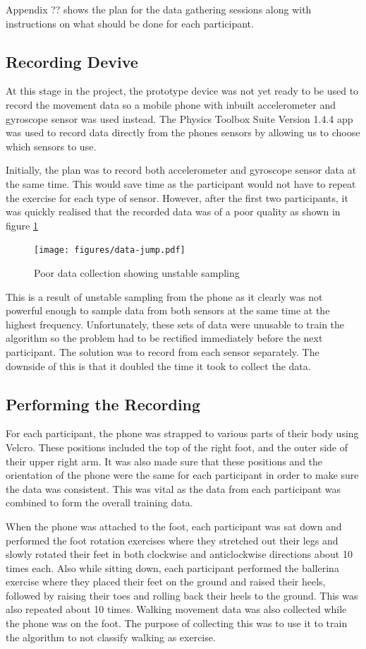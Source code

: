 Appendix ?? shows the plan for the data gathering sessions along with instructions on what should be done for each participant.

\subsection{Recording Devive}
At this stage in the project, the prototype device was not yet ready to be used to record the movement data so a mobile phone with inbuilt accelerometer and gyroscope sensor was used instead. The Physics Toolbox Suite Version 1.4.4 app \cite{vieyra2016} was used to record data directly from the phones sensors by allowing us to choose which sensors to use.

Initially, the plan was to record both accelerometer and gyroscope sensor data at the same time. This would save time as the participant would not have to repeat the exercise for each type of sensor. However, after the first two participants, it was quickly realised that the recorded data was of a poor quality as shown in figure \ref{fig:bad-data}

\begin{figure}
	\centering
	\texttt{[image: figures/data-jump.pdf]}
	\caption{Poor data collection showing unstable sampling\label{fig:bad-data}}
\end{figure}

This is a result of unstable sampling from the phone as it clearly was not powerful enough to sample data from both sensors at the same time at the highest frequency. Unfortunately, these sets of data were unusable to train the algorithm so the problem had to be rectified immediately before the next participant. The solution was to record from each sensor separately. The downside of this is that it doubled the time it took to collect the data.

\subsection{Performing the Recording}
For each participant, the phone was strapped to various parts of their body using Velcro. These positions included the top of the right foot, and the outer side of their upper right arm. It was also made sure that these positions and the orientation of the phone were the same for each participant in order to make sure the data was consistent. This was vital as the data from each participant was combined to form the overall training data.

When the phone was attached to the foot, each participant was sat down and performed the foot rotation exercises where they stretched out their legs and slowly rotated their feet in both clockwise and anticlockwise directions about 10 times each. Also while sitting down, each participant performed the ballerina exercise where they placed their feet on the ground and raised their heels, followed by raising their toes and rolling back their heels to the ground. This was also repeated about 10 times. Walking movement data was also collected while the phone was on the foot. The purpose of collecting this was to use it to train the algorithm to not classify walking as exercise.

